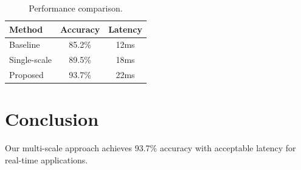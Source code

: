 \documentclass[conference]{IEEEtran}
\begin{document}
\begin{table}[htbp]
\caption{Performance comparison.}
\label{tab:results}
\centering
\begin{tabular}{lcc}
\toprule
Method & Accuracy & Latency \\
\midrule
Baseline & 85.2\% & 12ms \\
Single-scale & 89.5\% & 18ms \\
Proposed & 93.7\% & 22ms \\
\bottomrule
\end{tabular}
\end{table}

\section{Conclusion}
Our multi-scale approach achieves 93.7\% accuracy with
acceptable latency for real-time applications.



\end{document}
